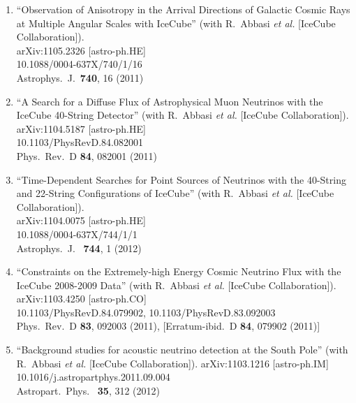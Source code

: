 \begin{enumerate}
\item ``Observation of Anisotropy in the Arrival Directions of Galactic
  Cosmic Rays at Multiple Angular Scales with IceCube'' (with R.~Abbasi
  {\it et al.}  [IceCube Collaboration]).  \\{}arXiv:1105.2326
  [astro-ph.HE] \\{}10.1088/0004-637X/740/1/16
  \\{}Astrophys.\ J.\ {\bf 740}, 16 (2011) %


\item ``A Search for a Diffuse Flux of Astrophysical Muon Neutrinos with the
  IceCube 40-String Detector'' (with R.~Abbasi {\it et al.}  [IceCube
    Collaboration]).  \\{}arXiv:1104.5187 [astro-ph.HE]
  \\{}10.1103/PhysRevD.84.082001 \\{}Phys.\ Rev.\ D {\bf 84}, 082001
  (2011) %


\item ``Time-Dependent Searches for Point Sources of Neutrinos with the
  40-String and 22-String Configurations of IceCube'' (with R.~Abbasi
  {\it et al.}  [IceCube Collaboration]).  \\{}arXiv:1104.0075
  [astro-ph.HE] \\{}10.1088/0004-637X/744/1/1 \\{}Astrophys.\ J.\ {\bf
    744}, 1 (2012) %


\item ``Constraints on the Extremely-high Energy Cosmic Neutrino Flux with
  the IceCube 2008-2009 Data'' (with R.~Abbasi {\it et al.}  [IceCube
    Collaboration]).  \\{}arXiv:1103.4250 [astro-ph.CO]
  \\{}10.1103/PhysRevD.84.079902, 10.1103/PhysRevD.83.092003
  \\{}Phys.\ Rev.\ D {\bf 83}, 092003 (2011), [Erratum-ibid.\ D {\bf
      84}, 079902 (2011)] %


\item ``Background studies for acoustic neutrino detection at the South
  Pole'' (with R.~Abbasi {\it et al.}  [IceCube Collaboration]). arXiv:1103.1216 [astro-ph.IM]
  \\{}10.1016/j.astropartphys.2011.09.004 \\{}Astropart.\ Phys.\ {\bf
    35}, 312 (2012) %




\end{enumerate}
